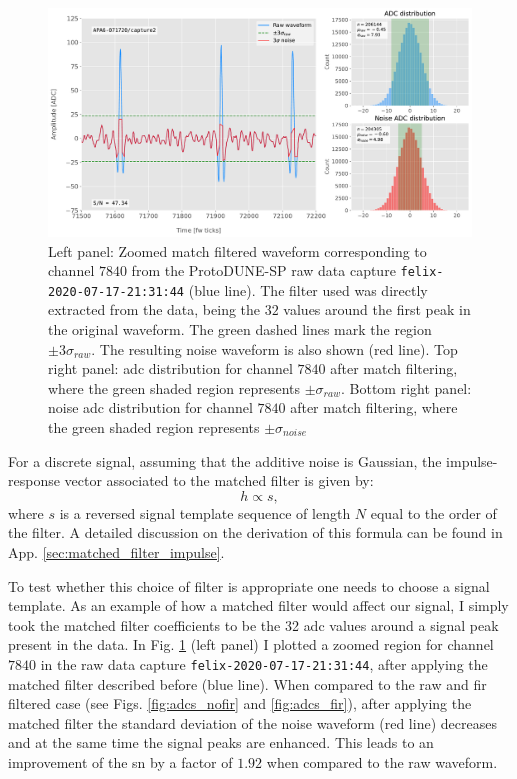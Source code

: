 \begin{figure}[t]
	\centering
	\includegraphics[width=1\linewidth]{Images/Matched_Filter/waveform_example_mf}
	\caption[Example matched filtered waveform from a ProtoDUNE-SP raw data capture.]{Left panel: Zoomed match filtered waveform corresponding to channel $7840$ from the ProtoDUNE-SP raw data capture \texttt{felix-2020-07-17-21:31:44} (blue line). The filter used was directly extracted from the data, being the $32$ values around the first peak in the original waveform. The green dashed lines mark the region $\pm3\sigma_{raw}$. The resulting noise waveform is also shown (red line). Top right panel: \gls{adc} distribution for channel $7840$ after match filtering, where the green shaded region represents $\pm \sigma_{raw}$. Bottom right panel: noise \gls{adc} distribution for channel $7840$ after match filtering, where the green shaded region represents $\pm \sigma_{noise}$}
	\label{fig:adcs_mf}
\end{figure}

For a discrete signal, assuming that the additive noise is Gaussian, the impulse-response vector associated to the matched filter is given by:
\begin{equation}
	h \propto s,
\end{equation}
where $s$ is a reversed signal template sequence of length $N$ equal to the order of the filter. A detailed discussion on the derivation of this formula can be found in App. \ref{sec:matched_filter_impulse}.

To test whether this choice of filter is appropriate one needs to choose a signal template. As an example of how a matched filter would affect our signal, I simply took the matched filter coefficients to be the 32 \gls{adc} values around a signal peak present in the data. In Fig. \ref{fig:adcs_mf} (left panel) I plotted a zoomed region for channel $7840$ in the raw data capture \texttt{felix-2020-07-17-21:31:44}, after applying the matched filter described before (blue line). When compared to the raw and \gls{fir} filtered case (see Figs. \ref{fig:adcs_nofir} and \ref{fig:adcs_fir}), after applying the matched filter the standard deviation of the noise waveform (red line) decreases and at the same time the signal peaks are enhanced. This leads to an improvement of the \gls{sn} by a factor of $1.92$ when compared to the raw waveform.

